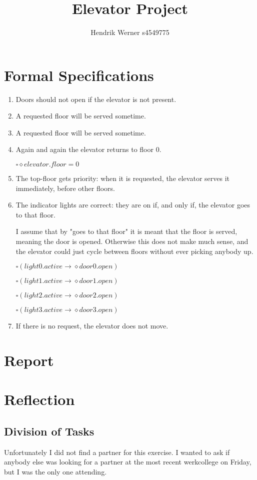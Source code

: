 \documentclass[12pt, a4paper]{article}
\title{Elevator Project}
\author{Hendrik Werner s4549775}
\begin{document}
\maketitle

\section{Formal Specifications}
\begin{enumerate}
	\item %
	Doors should not open if the elevator is not present.
	\item %
	A requested floor will be served sometime.
	\item %
	A requested floor will be served sometime.
	\item %
	Again and again the elevator returns to floor 0.

	$\square \diamond elevator.floor = 0$
	\item %
	The top-floor gets priority: when it is requested, the elevator serves it immediately, before other floors.
	\item %
	The indicator lights are correct: they are on if, and only if, the elevator goes to that floor.

	I assume that by "goes to that floor" it is meant that the floor is served, meaning the door is opened. Otherwise this does not make much sense, and the elevator could just cycle between floors without ever picking anybody up.

	$\square (light0.active \rightarrow \diamond door0.open)$

	$\square (light1.active \rightarrow \diamond door1.open)$

	$\square (light2.active \rightarrow \diamond door2.open)$

	$\square (light3.active \rightarrow \diamond door3.open)$
	\item %
	If there is no request, the elevator does not move.
\end{enumerate}

\section{Report}

\section{Reflection}
\subsection{Division of Tasks}
Unfortunately I did not find a partner for this exercise. I wanted to ask if anybody else was looking for a partner at the most recent werkcollege on Friday, but I was the only one attending.
\end{document}
